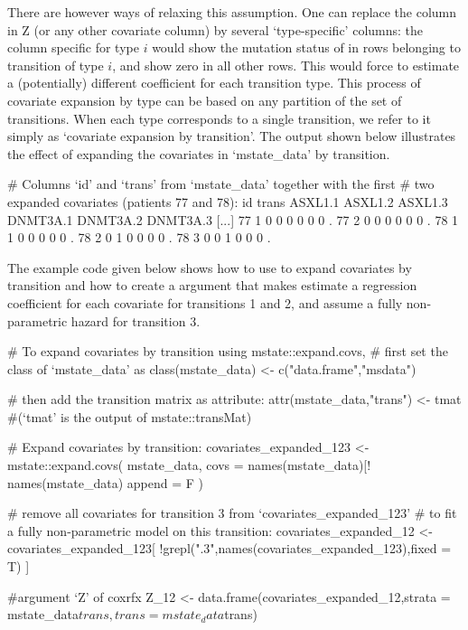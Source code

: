There are however ways of relaxing this assumption. One can replace the  column in Z (or any other covariate column) by several `type-specific'  columns: the  column specific for  type $i$  would show the mutation status of   in rows belonging to transition of type $i$, and show zero in all other rows. This would force  to estimate a (potentially) different  coefficient for each  transition type.  This process of covariate expansion by type can be based on any partition of the set of transitions. When each type corresponds to a single transition,  we refer to it simply as `covariate expansion by transition'. The output shown below illustrates the effect of expanding the covariates in `mstate\_data' by transition.
\begin{example}
# Columns `id' and `trans' from `mstate_data' together with the first
# two expanded covariates (patients 77 and 78):
    id trans ASXL1.1 ASXL1.2 ASXL1.3 DNMT3A.1 DNMT3A.2 DNMT3A.3  [...]  
    77     1       0       0       0        0        0        0     .
    77     2       0       0       0        0        0        0     .
    78     1       1       0       0        0        0        0     .
    78     2       0       1       0        0        0        0     .
    78     3       0       0       1        0        0        0     .
\end{example}        
The example code given below shows how to use  to expand covariates by transition and how to create a  argument that makes  estimate a regression coefficient for each covariate for transitions 1 and 2, and assume a fully non-parametric hazard for transition 3.
\begin{example}
# To expand covariates by transition using mstate::expand.covs, 
# first set the class of `mstate_data' as
class(mstate_data) <- c("data.frame","msdata")

# then add the transition matrix as attribute:
attr(mstate_data,"trans") <- tmat 
#(`tmat' is the output of mstate::transMat)

# Expand covariates by transition:
covariates_expanded_123 <- mstate::expand.covs(
    mstate_data,
    covs = names(mstate_data)[! names(mstate_data) %
    append = F
)

# remove all covariates for transition 3 from `covariates_expanded_123'
# to fit a fully non-parametric model on this transition:
covariates_expanded_12 <- covariates_expanded_123[
    !grepl(".3",names(covariates_expanded_123),fixed = T)
]

#argument `Z' of coxrfx
Z_12 <- data.frame(covariates_expanded_12,strata = mstate_data$trans,
                   trans = mstate_data$trans)
\end{example}


